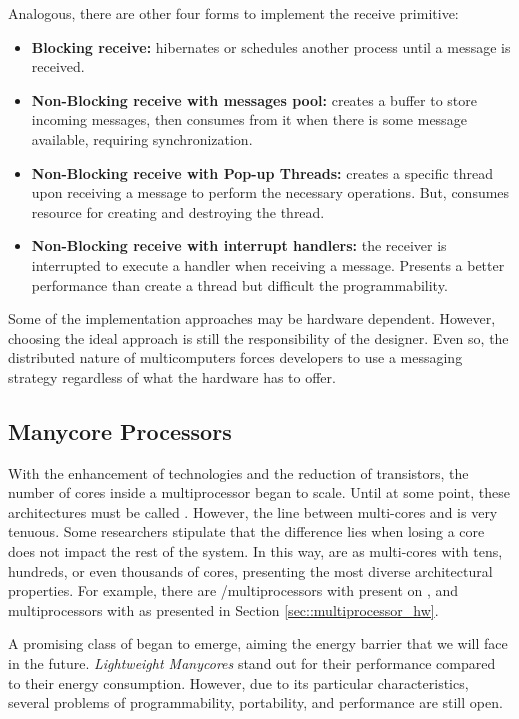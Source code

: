 				Analogous, there are other four forms to implement the receive primitive:
				\begin{itemize}
					\item \textbf{Blocking receive:} \cpu hibernates or schedules another
						process until a message is received.
					\item \textbf{Non-Blocking receive with messages pool:} \cpu creates
						a buffer to store incoming messages, then consumes from it when
						there is some message available, requiring synchronization.
					\item \textbf{Non-Blocking receive with Pop-up Threads:} creates a specific
						thread upon receiving a message to perform the necessary operations.
						But, consumes resource for creating and destroying the thread.
					\item \textbf{Non-Blocking receive with interrupt handlers:} the receiver
						is interrupted to execute a handler when receiving a message.
						Presents a better performance than create a thread but difficult
						the programmability.
				\end{itemize}

				Some of the implementation approaches may be hardware dependent.
				However, choosing the ideal approach is still the responsibility of the \os designer.
				Even so, the distributed nature of multicomputers forces developers to
				use a messaging strategy regardless of what the hardware has to offer.
	
	\subsection{Manycore Processors}
	\label{sec::manycores}

		With the enhancement of technologies and the reduction of transistors,
		the number of cores inside a multiprocessor began to scale.
		Until at some point, these architectures must be called \manycores.
		However, the line between multi-cores and \manycores is very tenuous.
		Some researchers stipulate that the difference lies when losing a core
		does not impact the rest of the system.
		In this way, \manycores are as multi-cores with tens, hundreds, or even
		thousands of cores, presenting the most diverse architectural properties.
		For example, there are \uma/\numa multiprocessors with \simd present on
		\gpus, and \numa multiprocessors with \mimd as \mppa presented in Section \ref{sec::multiprocessor_hw}.

		A promising class of \manycores began to emerge, aiming the energy barrier
		that we will face in the future.
		\textit{Lightweight Manycores} stand out for their performance compared
		to their energy consumption.
		However, due to its particular characteristics, several problems of
		programmability, portability, and performance are still open.


